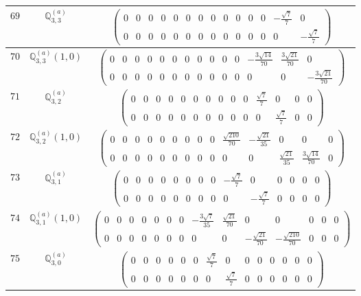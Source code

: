 \documentclass[fleqn,8pt,landscape]{jsarticle}
\begin{document}
\begin{center}
\begin{longtable}{ccc}
$ 69 $ & $ \mathbb{Q}_{3,3}^{(a)} $ & $ \begin{pmatrix} 0 & 0 & 0 & 0 & 0 & 0 & 0 & 0 & 0 & 0 & 0 & 0 & - \frac{\sqrt{7}}{7} & 0 \\ 0 & 0 & 0 & 0 & 0 & 0 & 0 & 0 & 0 & 0 & 0 & 0 & 0 & - \frac{\sqrt{7}}{7} \end{pmatrix} $ \\ \hline
$ 70 $ & $ \mathbb{Q}_{3,3}^{(a)}(1,0) $ & $ \begin{pmatrix} 0 & 0 & 0 & 0 & 0 & 0 & 0 & 0 & 0 & 0 & 0 & - \frac{3 \sqrt{14}}{70} & \frac{3 \sqrt{21}}{70} & 0 \\ 0 & 0 & 0 & 0 & 0 & 0 & 0 & 0 & 0 & 0 & 0 & 0 & 0 & - \frac{3 \sqrt{21}}{70} \end{pmatrix} $ \\ \hline
$ 71 $ & $ \mathbb{Q}_{3,2}^{(a)} $ & $ \begin{pmatrix} 0 & 0 & 0 & 0 & 0 & 0 & 0 & 0 & 0 & 0 & \frac{\sqrt{7}}{7} & 0 & 0 & 0 \\ 0 & 0 & 0 & 0 & 0 & 0 & 0 & 0 & 0 & 0 & 0 & \frac{\sqrt{7}}{7} & 0 & 0 \end{pmatrix} $ \\ \hline
$ 72 $ & $ \mathbb{Q}_{3,2}^{(a)}(1,0) $ & $ \begin{pmatrix} 0 & 0 & 0 & 0 & 0 & 0 & 0 & 0 & 0 & \frac{\sqrt{210}}{70} & - \frac{\sqrt{21}}{35} & 0 & 0 & 0 \\ 0 & 0 & 0 & 0 & 0 & 0 & 0 & 0 & 0 & 0 & 0 & \frac{\sqrt{21}}{35} & \frac{3 \sqrt{14}}{70} & 0 \end{pmatrix} $ \\ \hline
$ 73 $ & $ \mathbb{Q}_{3,1}^{(a)} $ & $ \begin{pmatrix} 0 & 0 & 0 & 0 & 0 & 0 & 0 & 0 & - \frac{\sqrt{7}}{7} & 0 & 0 & 0 & 0 & 0 \\ 0 & 0 & 0 & 0 & 0 & 0 & 0 & 0 & 0 & - \frac{\sqrt{7}}{7} & 0 & 0 & 0 & 0 \end{pmatrix} $ \\ \hline
$ 74 $ & $ \mathbb{Q}_{3,1}^{(a)}(1,0) $ & $ \begin{pmatrix} 0 & 0 & 0 & 0 & 0 & 0 & 0 & - \frac{3 \sqrt{7}}{35} & \frac{\sqrt{21}}{70} & 0 & 0 & 0 & 0 & 0 \\ 0 & 0 & 0 & 0 & 0 & 0 & 0 & 0 & 0 & - \frac{\sqrt{21}}{70} & - \frac{\sqrt{210}}{70} & 0 & 0 & 0 \end{pmatrix} $ \\ \hline
$ 75 $ & $ \mathbb{Q}_{3,0}^{(a)} $ & $ \begin{pmatrix} 0 & 0 & 0 & 0 & 0 & 0 & \frac{\sqrt{7}}{7} & 0 & 0 & 0 & 0 & 0 & 0 & 0 \\ 0 & 0 & 0 & 0 & 0 & 0 & 0 & \frac{\sqrt{7}}{7} & 0 & 0 & 0 & 0 & 0 & 0 \end{pmatrix} $ \\ \hline

\end{longtable}
\end{center}
\end{document}
